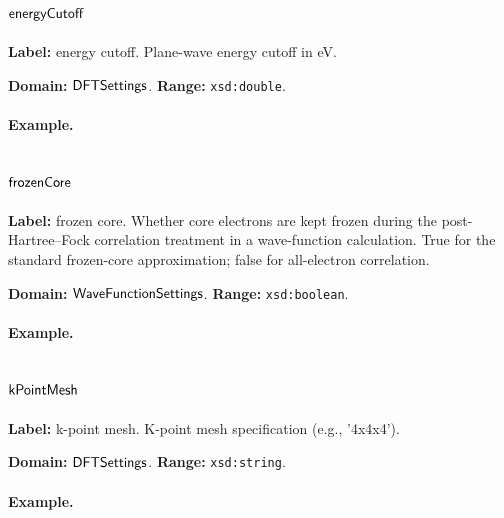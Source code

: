 \subsection{$\mathsf{energyCutoff}$}
\label{sec:term-energyCutoff}

\textbf{Label:} energy cutoff.
Plane-wave energy cutoff in eV.

\textbf{Domain:} $\mathsf{DFTSettings}$.
\textbf{Range:} \texttt{xsd:double}.

\paragraph{Example.}

\subsection{$\mathsf{frozenCore}$}
\label{sec:term-frozenCore}

\textbf{Label:} frozen core.
Whether core electrons are kept frozen during the post-Hartree--Fock correlation treatment in a wave-function calculation. True for the standard frozen-core approximation; false for all-electron correlation.

\textbf{Domain:} $\mathsf{WaveFunctionSettings}$.
\textbf{Range:} \texttt{xsd:boolean}.

\paragraph{Example.}

\subsection{$\mathsf{kPointMesh}$}
\label{sec:term-kPointMesh}

\textbf{Label:} k-point mesh.
K-point mesh specification (e.g., '4x4x4').

\textbf{Domain:} $\mathsf{DFTSettings}$.
\textbf{Range:} \texttt{xsd:string}.

\paragraph{Example.}

